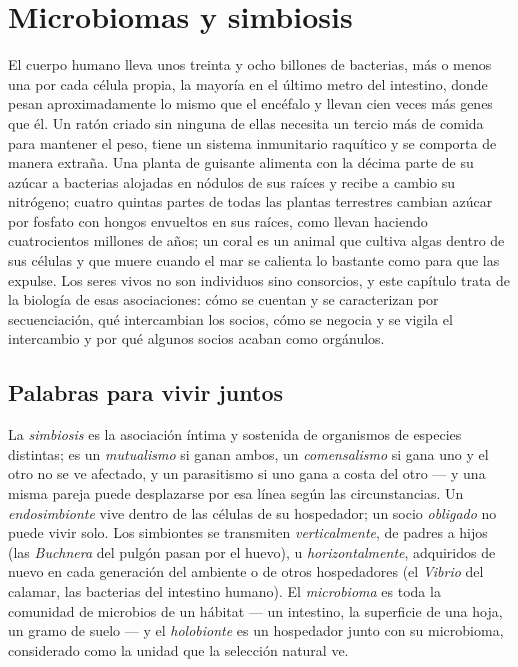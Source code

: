 \chapter{Microbiomas y simbiosis}\label{ch:b3:microbiomes}

El cuerpo humano lleva unos treinta y ocho billones de bacterias, más o
menos una por cada célula propia, la mayoría en el último metro del
intestino, donde pesan aproximadamente lo mismo que el encéfalo y llevan
cien veces más genes que él. Un ratón criado sin ninguna de ellas necesita un
tercio más de comida para mantener el peso, tiene un sistema inmunitario
raquítico y se comporta de manera extraña. Una planta de guisante
alimenta con la décima parte de su azúcar a bacterias alojadas en nódulos
de sus raíces y recibe a cambio su nitrógeno; cuatro quintas partes de
todas las plantas terrestres cambian azúcar por fosfato con hongos
envueltos en sus raíces, como llevan haciendo cuatrocientos millones de
años; un coral es un animal que cultiva algas dentro de sus células y que
muere cuando el mar se calienta lo bastante como para que las expulse.
Los seres vivos no son individuos sino consorcios, y este capítulo trata
de la biología de esas asociaciones: cómo se cuentan y se caracterizan
por secuenciación, qué intercambian los socios, cómo se negocia y se
vigila el intercambio y por qué algunos socios acaban como orgánulos.

\section{Palabras para vivir juntos}

\begin{definition}[Simbiosis]\label{def:b3:microbiomes:symbiosis}
La \emph{simbiosis} es la asociación íntima y sostenida de organismos de
especies distintas; es un \emph{mutualismo} si ganan ambos, un
\emph{comensalismo} si gana uno y el otro no se ve afectado, y un
parasitismo si uno gana a costa del otro --- y una misma pareja puede
desplazarse por esa línea según las circunstancias. Un
\emph{endosimbionte} vive dentro de las células de su hospedador; un
socio \emph{obligado} no puede vivir solo. Los simbiontes se transmiten
\emph{verticalmente}, de padres a hijos (las \emph{Buchnera} del pulgón
pasan por el huevo), u \emph{horizontalmente}, adquiridos de nuevo en
cada generación del ambiente o de otros hospedadores (el \emph{Vibrio}
del calamar, las bacterias del intestino humano). El \emph{microbioma} es
toda la comunidad de microbios de un hábitat --- un intestino, la
superficie de una hoja, un gramo de suelo --- y el \emph{holobionte} es
un hospedador junto con su microbioma, considerado como la unidad que la
selección natural ve.
\end{definition}

